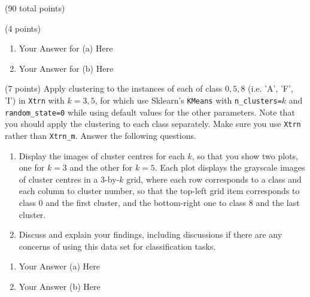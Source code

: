 \documentclass[12pt]{article}
\begin{document}
\begin{question}{(90 total points) \qTwoTitle}
\begin{subquestion}{(4 points)
  }
  \begin{answerbox}{0.5\textheight}
    \begin{enumerate}
    \item Your Answer for (a) Here
    \item Your Answer for (b) Here
    \end{enumerate}
  \end{answerbox}
  


\end{subquestion}

\begin{subquestion}{(7 points)
    Apply \kmeans clustering to the instances of each of class $0,5,8$ (i.e. 'A', 'F', 'I') in {\tt Xtrn} with $k = 3,5$, for which use Sklearn's {\tt KMeans} with {\tt n\_clusters=}$k$ and {\tt random\_state=0} while using default values for the other parameters. Note that you should apply the clustering to each class separately. Make sure you use {\tt Xtrn} rather than {\tt Xtrn\_m}.
    Answer the following questions.
  }
  \begin{enumerate}\NARROWITEM
  \item Display the images of cluster centres for each $k$, so that you show two plots, one for $k=3$  and the other for $k=5$. Each plot displays the grayscale images of cluster centres in a 3-by-$k$ grid, where each row corresponds to a class and each column to cluster number, so that the top-left grid item corresponds to class 0 and the first cluster, and the bottom-right one to class 8 and the last cluster.
  \item Discuss and explain your findings, including discussions if there are any concerns of using this data set for classification tasks.
  \end{enumerate}
   

  \begin{answerbox}{0.75\textheight}
    \begin{enumerate}
    \item Your Answer (a) Here
    \item Your Answer (b) Here
    \end{enumerate}
  \end{answerbox}
  


\end{subquestion}


\end{question}
\end{document}
